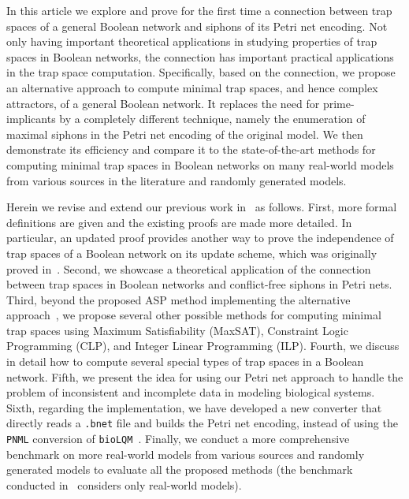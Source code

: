 \documentclass[preprint,12pt]{elsarticle}
\begin{document}
In this article we explore and prove for the first time a connection between trap spaces of a general Boolean network and siphons of its Petri net encoding.
Not only having important theoretical applications in studying properties of trap spaces in Boolean networks, the connection has important practical applications in the trap space computation.
Specifically, based on the connection, we propose an alternative approach to compute minimal trap spaces, and hence complex attractors, of a general Boolean network.
It replaces the need for prime-implicants by a completely different technique, namely the enumeration of maximal siphons in the Petri net encoding of the original model.
We then demonstrate its efficiency and compare it to the state-of-the-art methods for computing minimal trap spaces in Boolean networks on many real-world models from various sources in the literature and randomly generated models.



Herein we revise and extend our previous work in~\cite{DBLP:conf/cmsb/TrinhBHS22} as follows.
First, more formal definitions are given and the existing proofs are made more detailed.
In particular, an updated proof provides another way to prove the independence of trap spaces of a Boolean network on its update scheme, which was originally proved in~\cite{klarner2015computing}.
Second, we showcase a theoretical application of the connection between trap spaces in Boolean networks and conflict-free siphons in Petri nets.
Third, beyond the proposed ASP method implementing the alternative approach~\cite{DBLP:conf/cmsb/TrinhBHS22}, we propose several other possible methods for computing minimal trap spaces using Maximum Satisfiability (MaxSAT), Constraint Logic Programming (CLP), and Integer Linear Programming (ILP).
Fourth, we discuss in detail how to compute several special types of trap spaces in a Boolean network.
Fifth, we present the idea for using our Petri net approach to handle the problem of inconsistent and incomplete data in modeling biological systems.
Sixth, regarding the implementation, we have developed a new converter that directly reads a \texttt{.bnet} file and builds the Petri net encoding, instead of using the \texttt{PNML} conversion of \texttt{bioLQM}~\cite{DBLP:conf/cmsb/TrinhBHS22}.
Finally, we conduct a more comprehensive benchmark on more real-world models from various sources and randomly generated models to evaluate all the proposed methods (the benchmark conducted in~\cite{DBLP:conf/cmsb/TrinhBHS22} considers only real-world models).
\end{document}
